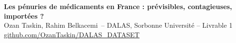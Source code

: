 \documentclass[11pt, a4paper]{article}
\begin{document}
\begin{center}
{\normalsize\bfseries Les pénuries de médicaments en France : prévisibles, contagieuses, importées ?}\\[3pt]
{\footnotesize Ozan Taskin, Rahim Belkacemi\ -- DALAS, Sorbonne Université -- Livrable 1\\ \href{https://github.com/OzanTaskin/DALAS_DATASET}{github.com/OzanTaskin/DALAS\_DATASET}}
\end{center}
\vspace{-1.2ex}



\end{document}
